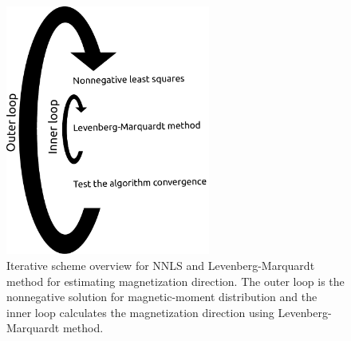 
\begin{figure}
	\centering
	\includegraphics[width=0.6\textwidth]{Fig/algorithm_LM_NNLS.pdf}
	\caption{Iterative scheme overview for NNLS and Levenberg-Marquardt method for estimating magnetization direction. The outer loop is the nonnegative solution for magnetic-moment distribution and the inner loop calculates the magnetization direction using Levenberg-Marquardt method.}
	\label{fig:scheme_LM_NNLS}
\end{figure}